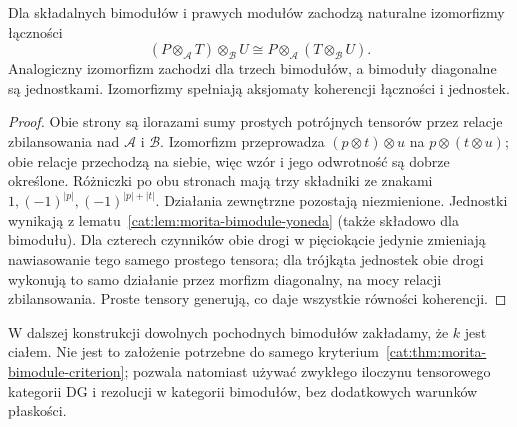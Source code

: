 \begin{stwierdzenie}\label{cat:prop:morita-bimodule-assoc}
Dla składalnych bimodułów i prawych modułów zachodzą naturalne izomorfizmy łączności
\[
 (P\otimes_{\mathcal A}T)\otimes_{\mathcal B}U
 \cong P\otimes_{\mathcal A}(T\otimes_{\mathcal B}U).
\]
Analogiczny izomorfizm zachodzi dla trzech bimodułów, a bimoduły diagonalne są jednostkami. Izomorfizmy spełniają aksjomaty koherencji łączności i jednostek.
\end{stwierdzenie}
\begin{proof}
Obie strony są ilorazami sumy prostych potrójnych tensorów przez relacje zbilansowania nad $\mathcal A$ i $\mathcal B$. Izomorfizm przeprowadza $(p\otimes t)\otimes u$ na $p\otimes(t\otimes u)$; obie relacje przechodzą na siebie, więc wzór i jego odwrotność są dobrze określone. Różniczki po obu stronach mają trzy składniki ze znakami $1,(-1)^{|p|},(-1)^{|p|+|t|}$. Działania zewnętrzne pozostają niezmienione. Jednostki wynikają z lematu~\ref{cat:lem:morita-bimodule-yoneda} (także składowo dla bimodułu). Dla czterech czynników obie drogi w pięciokącie jedynie zmieniają nawiasowanie tego samego prostego tensora; dla trójkąta jednostek obie drogi wykonują to samo działanie przez morfizm diagonalny, na mocy relacji zbilansowania. Proste tensory generują, co daje wszystkie równości koherencji.
\end{proof}

W dalszej konstrukcji dowolnych pochodnych bimodułów zakładamy, że $k$ jest ciałem. Nie jest to założenie potrzebne do samego kryterium~\ref{cat:thm:morita-bimodule-criterion}; pozwala natomiast używać zwykłego iloczynu tensorowego kategorii DG i rezolucji w kategorii bimodułów, bez dodatkowych warunków płaskości.

